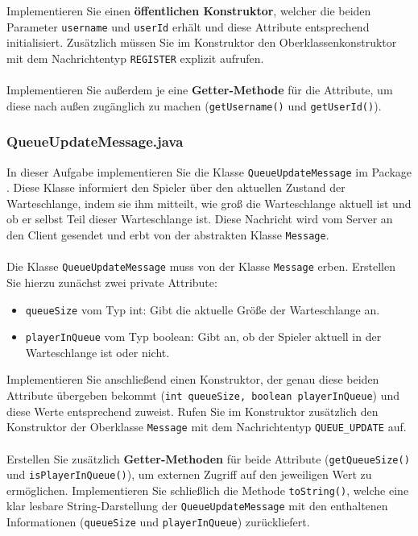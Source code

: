 \documentclass[12pt]{article}
\begin{document}
Implementieren Sie einen \textbf{öffentlichen Konstruktor}, welcher die beiden Parameter \texttt{username} und \texttt{userId} erhält 
und diese Attribute entsprechend initialisiert. 
Zusätzlich müssen Sie im Konstruktor den Oberklassenkonstruktor mit dem Nachrichtentyp \texttt{REGISTER} explizit aufrufen.
\\ \\
Implementieren Sie außerdem je eine \textbf{Getter-Methode} für die Attribute, 
um diese nach außen zugänglich zu machen (\texttt{getUsername()} und \texttt{getUserId()}).

\subsubsection*{QueueUpdateMessage.java}

In dieser Aufgabe implementieren Sie die Klasse \texttt{QueueUpdateMessage} im Package . 
Diese Klasse informiert den Spieler über den aktuellen Zustand der Warteschlange, 
indem sie ihm mitteilt, wie groß die Warteschlange aktuell ist und ob er selbst Teil dieser Warteschlange ist. 
Diese Nachricht wird vom Server an den Client gesendet und erbt von der abstrakten Klasse \texttt{Message}.
\\ \\
Die Klasse \texttt{QueueUpdateMessage} muss von der Klasse \texttt{Message} erben. 
Erstellen Sie hierzu zunächst zwei private Attribute:
\begin{itemize}
    \item \texttt{queueSize} vom Typ int: Gibt die aktuelle Größe der Warteschlange an.
    \item \texttt{playerInQueue} vom Typ boolean: Gibt an, ob der Spieler aktuell in der Warteschlange ist oder nicht.
\end{itemize}

Implementieren Sie anschließend einen Konstruktor, der genau diese beiden Attribute übergeben bekommt 
(\texttt{int queueSize, boolean playerInQueue}) und diese Werte entsprechend zuweist. 
Rufen Sie im Konstruktor zusätzlich den Konstruktor der Oberklasse \texttt{Message} 
mit dem Nachrichtentyp \texttt{QUEUE\_UPDATE} auf.
\\ \\
Erstellen Sie zusätzlich \textbf{Getter-Methoden} für beide Attribute (\texttt{getQueueSize()} und \texttt{isPlayerInQueue()}), 
um externen Zugriff auf den jeweiligen Wert zu ermöglichen. 
Implementieren Sie schließlich die Methode \texttt{toString()}, 
welche eine klar lesbare String-Darstellung der \texttt{QueueUpdateMessage} 
mit den enthaltenen Informationen (\texttt{queueSize} und \texttt{playerInQueue}) zurückliefert.
\end{document}
